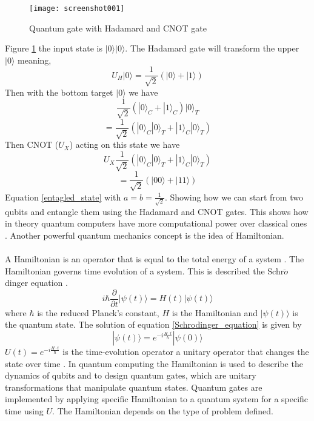 \documentclass{Assignment}
\begin{document}
\begin{figure}[H]
	\centering
	\texttt{[image: screenshot001]}
	\caption{Quantum gate with Hadamard and CNOT gate}
	\label{entanglement}
\end{figure}
Figure \ref{entanglement} the input state is $|0\rangle|0\rangle$.
The Hadamard gate will transform the upper $|0\rangle$ meaning,
$$U_H|0\rangle = \frac{1}{\sqrt{2}}(|0 \rangle + |1\rangle)$$
Then with the bottom target $|0\rangle$ we have
 $$\frac{1}{\sqrt{2}}(|0 \rangle_C + |1\rangle_C)|0\rangle_T$$
$$=\frac{1}{\sqrt{2}}(|0 \rangle_C|0 \rangle_T + |1\rangle_C|0 \rangle_T)$$
Then CNOT ($U_X$) acting on this state we have 
$$U_X\frac{1}{\sqrt{2}}(|0 \rangle_C|0 \rangle_T + |1\rangle_C|0 \rangle_T) $$
$$ =\frac{1}{\sqrt{2}}\left(|00\rangle + |11\rangle\right)$$
Equation \eqref{entagled_state} with $a=b = \frac{1}{\sqrt{2}}$.
Showing how we can start from two qubits and entangle them using the Hadamard and CNOT gates.
This shows how in theory quantum computers have more computational power over classical ones \cite{Deutsch1989}.
Another powerful quantum mechanics concept is the idea of Hamiltonian.
\\\\
A Hamiltonian is an operator that is equal to the total energy of a system \cite{mcintyre_quantum_2012}.
The Hamiltonian governs time evolution of a system.
This is described the Schr$\ddot{o}$dinger equation \cite{mcintyre_quantum_2012}.
\begin{equation}
i \hbar\frac{\partial}{\partial t}|\psi(t)\rangle = H(t)|\psi(t)\rangle
\label{Schrodinger_equation}
\end{equation}
where $\hbar$ is the reduced Planck's constant, $H$ is the Hamiltonian and $|\psi(t)\rangle$ is the quantum state.
The solution of equation \eqref{Schrodinger_equation} is given by 
\begin{equation}
|\psi(t)\rangle = e^{-i\frac{ H\cdot t}{\hbar}}|\psi(0)\rangle
\end{equation}
$U(t)=e^{-i\frac{ H\cdot t}{\hbar}} $ is the time-evolution operator a unitary operator that changes the state over time \cite{UQS}.
In quantum computing the Hamiltonian is used to describe the dynamics of qubits and to design quantum gates, which are unitary transformations that manipulate quantum states. \cite{Deutsch1989} 
Quantum gates are implemented by applying specific Hamiltonian to a quantum system for a specific time using $U$.
The Hamiltonian depends on the type of problem defined.
\end{document}
